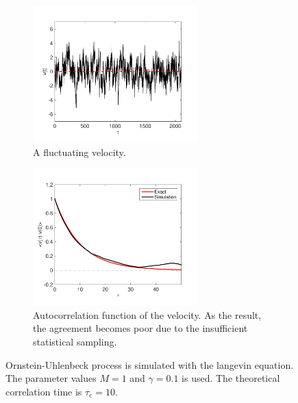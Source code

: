 \begin{figure}
	\centering
	\begin{subfigure}{0.45\textwidth}
		\centering
		\includegraphics[width=2.5in]{18.Langevin/velocity.pdf}	
		\caption{A fluctuating velocity.}
		\label{fig:brownian_velocity}
	\end{subfigure}
	\begin{subfigure}{0.45\textwidth}
		\centering
		\includegraphics[width=2.5in]{18.Langevin/correlation.pdf}
		\caption{Autocorrelation function of the velocity.  As the result, the agreement becomes poor due to the insufficient statistical sampling.}
		\label{fig:correlation}
	\end{subfigure}
\caption{Ornstein-Uhlenbeck process is simulated with the langevin equation.  The parameter values $M=1$ and $\gamma=0.1$ is used. The theoretical correlation time is $\tau_\text{c}=10$.}
\label{fig:v_autocorr}
\end{figure}



